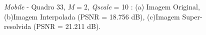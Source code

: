 \begin{figure}[h]
    \centering
    \qquad
    \qquad
    \caption{\textit{Mobile} - Quadro 33, $M = 2$, \textit{Qscale} = 10 : (a) Imagem Original, (b)Imagem Interpolada (PSNR = 18.756 dB), (c)Imagem Super-resolvida (PSNR = 21.211 dB).}
	    
    \label{fig:6}
\end{figure}